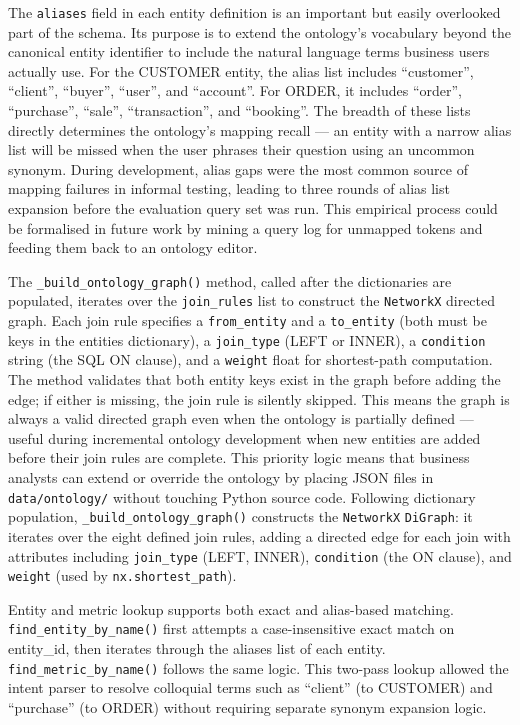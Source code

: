 \documentclass[12pt,a4paper]{report}
\begin{document}
The \texttt{aliases} field in each entity definition is an important but easily overlooked part of the schema. Its purpose is to extend the ontology's vocabulary beyond the canonical entity identifier to include the natural language terms business users actually use. For the CUSTOMER entity, the alias list includes ``customer'', ``client'', ``buyer'', ``user'', and ``account''. For ORDER, it includes ``order'', ``purchase'', ``sale'', ``transaction'', and ``booking''. The breadth of these lists directly determines the ontology's mapping recall — an entity with a narrow alias list will be missed when the user phrases their question using an uncommon synonym. During development, alias gaps were the most common source of mapping failures in informal testing, leading to three rounds of alias list expansion before the evaluation query set was run. This empirical process could be formalised in future work by mining a query log for unmapped tokens and feeding them back to an ontology editor.

The \texttt{\_build\_ontology\_graph()} method, called after the dictionaries are populated, iterates over the \texttt{join\_rules} list to construct the \texttt{NetworkX} directed graph. Each join rule specifies a \texttt{from\_entity} and a \texttt{to\_entity} (both must be keys in the entities dictionary), a \texttt{join\_type} (LEFT or INNER), a \texttt{condition} string (the SQL ON clause), and a \texttt{weight} float for shortest-path computation. The method validates that both entity keys exist in the graph before adding the edge; if either is missing, the join rule is silently skipped. This means the graph is always a valid directed graph even when the ontology is partially defined — useful during incremental ontology development when new entities are added before their join rules are complete. This priority logic means that business analysts can extend or override the ontology by placing JSON files in \texttt{data/ontology/} without touching Python source code. Following dictionary population, \texttt{\_build\_ontology\_graph()} constructs the \texttt{NetworkX} \texttt{DiGraph}: it iterates over the eight defined join rules, adding a directed edge for each join with attributes including \texttt{join\_type} (LEFT, INNER), \texttt{condition} (the ON clause), and \texttt{weight} (used by \texttt{nx.shortest\_path}).

Entity and metric lookup supports both exact and alias-based matching. \texttt{find\_entity\_by\_name()} first attempts a case-insensitive exact match on entity\_id, then iterates through the aliases list of each entity. \texttt{find\_metric\_by\_name()} follows the same logic. This two-pass lookup allowed the intent parser to resolve colloquial terms such as ``client'' (to CUSTOMER) and ``purchase'' (to ORDER) without requiring separate synonym expansion logic.
\end{document}
